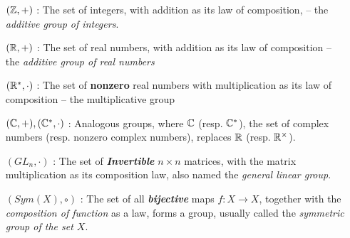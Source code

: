     \begin{example}
        
        \item []\label{ex:group-examples}
        \begin{itemize}
        \item[$(\mathbb{Z}, +)$]: The set of integers, with addition as its law of composition, -- the \textit{additive group of integers}. 
        \item[$(\mathbb{R}, +)$]: The set of real numbers, with addition as its law of composition -- the \textit{additive group of real numbers}
        \item[$(\mathbb{R}^*, \cdot)$]: The set of \textbf{nonzero} real numbers with multiplication as its law of composition -- the multiplicative group
        \item[$(\mathbb{C}, +), (\mathbb{C}^*, \cdot)$]: Analogous groups, where $\mathbb{C}$ (resp. $\mathbb{C}^*$), the set of complex numbers (resp. nonzero complex numbers), replaces $\mathbb{R}$ (resp. $\mathbb{R}^\times$).
        \item[$(GL_n, \cdot)$]: The set of \textit{\textbf{Invertible}}  $n \times n$ matrices, with the matrix multiplication as its composition law, also named the \textit{general linear group}. 
        \item[$(Sym(X), \circ)$]: The set of all \textbf{\textit{bijective}} maps $f: X \longrightarrow X$, together with the \textit{composition of function} as a law, forms a group, usually called the \textit{symmetric group of the set $X$}. 
        \end{itemize}

\end{example}

